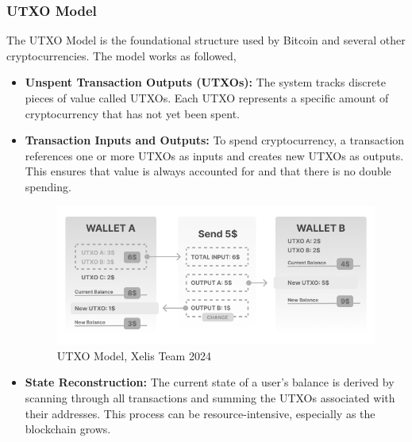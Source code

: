 \documentclass[10pt,a4paper,twocolumn]{article}
\begin{document}
\subsubsection{UTXO Model}

The UTXO Model is the foundational structure used by Bitcoin and several other cryptocurrencies. The model works as followed,\\

\begin{itemize}
    \item \textbf{Unspent Transaction Outputs (UTXOs):} The system tracks discrete pieces of value called UTXOs. Each UTXO represents a specific amount of cryptocurrency that has not yet been spent.\\
    
    \item \textbf{Transaction Inputs and Outputs:} To spend cryptocurrency, a transaction references one or more UTXOs as inputs and creates new UTXOs as outputs. This ensures that value is always accounted for and that there is no double spending.\\
   
\begin{figure}
\centering
\includegraphics[width=1\linewidth]{Frame 1 (8).png}
\caption{UTXO Model, Xelis Team 2024}
\end{figure}
  
    \item \textbf{State Reconstruction:} The current state of a user's balance is derived by scanning through all transactions and summing the UTXOs associated with their addresses. This process can be resource-intensive, especially as the blockchain grows.\\
\end{itemize}
\end{document}

